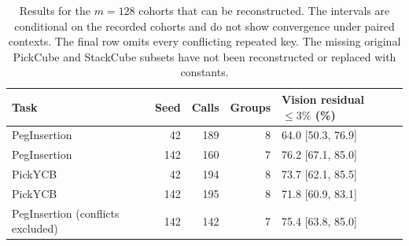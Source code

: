 \begin{table}[htbp]
\centering\small
\setlength{\tabcolsep}{3.5pt}
\caption{Results for the $m=128$ cohorts that can be reconstructed. The intervals are conditional on the recorded cohorts and do not show convergence under paired contexts. The final row omits every conflicting repeated key. The missing original PickCube and StackCube subsets have not been reconstructed or replaced with constants.}
\label{tab:m128}
\begin{tabular}{lrrrl}
\toprule
Task & Seed & Calls & Groups & Vision residual $\leq3\%$ (\%) \\
\midrule
PegInsertion & 42 & 189 & 8 & 64.0 [50.3, 76.9] \\
PegInsertion & 142 & 160 & 7 & 76.2 [67.1, 85.0] \\
PickYCB & 42 & 194 & 8 & 73.7 [62.1, 85.5] \\
PickYCB & 142 & 195 & 8 & 71.8 [60.9, 83.1] \\
PegInsertion (conflicts excluded) & 142 & 142 & 7 & 75.4 [63.8, 85.0] \\
\bottomrule
\end{tabular}
\end{table}
